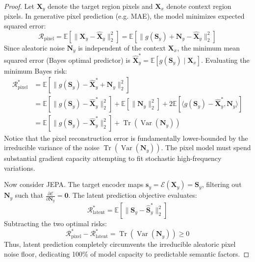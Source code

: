 \documentclass[11pt,a4paper]{article}
\theoremstyle{definition}
\begin{document}
\begin{proof}
Let $\mathbf{X}_y$ denote the target region pixels and $\mathbf{X}_x$ denote context region pixels.
In generative pixel prediction (e.g. MAE), the model minimizes expected squared error:
{\boldmath
\begin{equation}
\mathcal{R}_{\text{pixel}} = \mathbb{E}\left[ \|\mathbf{X}_y - \hat{\mathbf{X}}_y\|_2^2 \right] = \mathbb{E}\left[ \|g(\mathbf{S}_y) + \mathbf{N}_y - \hat{\mathbf{X}}_y\|_2^2 \right]
\end{equation}
}
Since aleatoric noise $\mathbf{N}_y$ is independent of the context $\mathbf{X}_x$, the minimum mean squared error (Bayes optimal predictor) is $\hat{\mathbf{X}}_y^* = \mathbb{E}[g(\mathbf{S}_y) \mid \mathbf{X}_x]$.
Evaluating the minimum Bayes risk:
{\boldmath
\begin{align}
\mathcal{R}_{\text{pixel}}^* &= \mathbb{E}\left[ \|g(\mathbf{S}_y) - \hat{\mathbf{X}}_y^* + \mathbf{N}_y\|_2^2 \right] \\
&= \mathbb{E}\left[ \|g(\mathbf{S}_y) - \hat{\mathbf{X}}_y^*\|_2^2 \right] + \mathbb{E}[\|\mathbf{N}_y\|_2^2] + 2 \mathbb{E}[\langle g(\mathbf{S}_y) - \hat{\mathbf{X}}_y^*, \mathbf{N}_y \rangle] \\
&= \mathbb{E}\left[ \|g(\mathbf{S}_y) - \hat{\mathbf{X}}_y^*\|_2^2 \right] + \operatorname{Tr}(\operatorname{Var}(\mathbf{N}_y))
\end{align}
}
Notice that the pixel reconstruction error is fundamentally lower-bounded by the irreducible variance of the noise $\operatorname{Tr}(\operatorname{Var}(\mathbf{N}_y))$. The pixel model must spend substantial gradient capacity attempting to fit stochastic high-frequency variations.

Now consider JEPA. The target encoder maps $\mathbf{s}_y = \mathcal{E}(\mathbf{X}_y) = \mathbf{S}_y$, filtering out $\mathbf{N}_y$ such that $\frac{\partial \mathcal{E}}{\partial \mathbf{N}_y} = \mathbf{0}$.
The latent prediction objective evaluates:
{\boldmath
\begin{equation}
\mathcal{R}_{\text{latent}}^* = \mathbb{E}\left[ \|\mathbf{S}_y - \hat{\mathbf{S}}_y^*\|_2^2 \right]
\end{equation}
}
Subtracting the two optimal risks:
{\boldmath
\begin{equation}
\mathcal{R}_{\text{pixel}}^* - \mathcal{R}_{\text{latent}}^* = \operatorname{Tr}(\operatorname{Var}(\mathbf{N}_y)) \ge 0
\end{equation}
}
Thus, latent prediction completely circumvents the irreducible aleatoric pixel noise floor, dedicating 100\% of model capacity to predictable semantic factors.
\end{proof}
\end{document}
